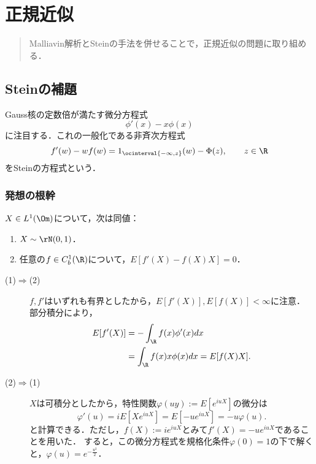 \documentclass[uplatex,dvipdfmx]{jsreport}
\begin{document}
\chapter{正規近似} 

\begin{quotation}
    Malliavin解析とSteinの手法を併せることで，正規近似の問題に取り組める．
\end{quotation}

\section{Steinの補題}

\begin{tcolorbox}[colframe=ForestGreen, colback=ForestGreen!10!white,breakable,colbacktitle=ForestGreen!40!white,coltitle=black,fonttitle=\bfseries\sffamily,
title=]
    Gauss核の定数倍が満たす微分方程式
    \[\phi'(x)-x\phi(x)\]
    に注目する．これの一般化である非斉次方程式
    \[f'(w)-wf(w)=1_{\ocinterval{-\infty,z}}(w)-\Phi(z),\qquad z\in\R\]
    をSteinの方程式という．
\end{tcolorbox}

\subsection{発想の根幹}

\begin{lemma}[Steinの補題]
    $X\in L^1(\Om)$について，次は同値：
    \begin{enumerate}
        \item $X\sim\rN(0,1)$．
        \item 任意の$f\in C^1_b(\R)$について，$E[f'(X)-f(X)X]=0$．
    \end{enumerate}
\end{lemma}
\begin{Proof}\mbox{}
    \begin{description}
        \item[(1)$\Rightarrow$(2)] $f,f'$はいずれも有界としたから，$E[f'(X)],E[f(X)]<\infty$に注意．
        部分積分により，
        \begin{align*}
            E[f'(X)]&=-\int_\R f(x)\phi'(x)dx\\
            &=\int_\R f(x)x\phi(x)dx=E[f(X)X].
        \end{align*}
        \item[(2)$\Rightarrow$(1)] $X$は可積分としたから，特性関数$\varphi(uy):=E[e^{iuX}]$の微分は
        \[\varphi'(u)=iE[Xe^{iuX}]=E[-ue^{iuX}]=-u\varphi(u).\]
        と計算できる．ただし，$f(X):=ie^{iuX}$とみて$f'(X)=-ue^{iuX}$であることを用いた．
        すると，この微分方程式を規格化条件$\varphi(0)=1$の下で解くと，$\varphi(u)=e^{-\frac{u^2}{2}}$．
    \end{description}
\end{Proof}
\end{document}
